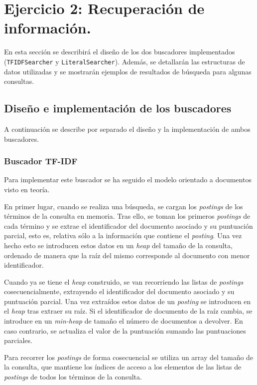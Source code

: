 \documentclass[spanish]{assignment}
\begin{document}
	\section{Ejercicio 2: Recuperación de información.}
	En esta sección se describirá el diseño de los dos buscadores implementados (\texttt{TFIDFSearcher} y \texttt{LiteralSearcher}). Además, se detallarán las estructuras de datos utilizadas y se mostrarán ejemplos de resultados de búsqueda para algunas consultas.
	
	\subsection{Diseño e implementación de los buscadores}
	A continuación se describe por separado el diseño y la implementación de ambos buscadores.
	
	\subsubsection{Buscador TF-IDF}
	Para implementar este buscador se ha seguido el modelo orientado a documentos visto en teoría. 
	
	En primer lugar, cuando se realiza una búsqueda, se cargan los \textit{postings} de los términos de la consulta en memoria. Tras ello, se toman los primeros \textit{postings} de cada término y se extrae el identificador del documento asociado y su puntuación parcial, esto es, relativa sólo a la información que contiene el \textit{posting}. Una vez hecho esto se introducen estos datos en un \textit{heap} del tamaño de la consulta, ordenado de manera que la raíz del mismo corresponde al documento con menor identificador. 
	
	Cuando ya se tiene el \textit{heap} construido, se van recorriendo las listas de \textit{postings} cosecuencialmente, extrayendo el identificador del documento asociado y su puntuación parcial. Una vez extraídos estos datos de un \textit{posting} se introducen en el \textit{heap} tras extraer su raíz.
	Si el identificador de documento de la raíz cambia, se introduce en un \textit{min-heap} de tamaño el número de documentos a devolver. En caso contrario, se actualiza el valor de la puntuación sumando las puntuaciones parciales.
	
	Para recorrer los \textit{postings} de forma cosecuencial se utiliza un array del tamaño de la consulta, que mantiene los índices de acceso a los elementos de las listas de \textit{postings} de todos los términos de la consulta.
	
\end{document}
